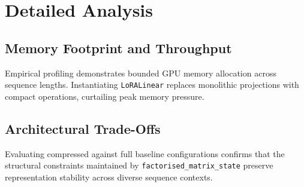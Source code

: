 \section{Detailed Analysis}

\subsection{Memory Footprint and Throughput}
Empirical profiling demonstrates bounded GPU memory allocation across sequence lengths. Instantiating \texttt{LoRALinear} replaces monolithic projections with compact operations, curtailing peak memory pressure.

\subsection{Architectural Trade-Offs}
Evaluating compressed against full baseline configurations confirms that the structural constraints maintained by \texttt{factorised_matrix_state} preserve representation stability across diverse sequence contexts.
